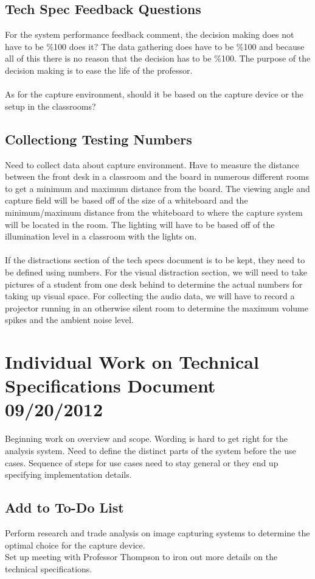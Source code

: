 \documentclass[]{article}
\begin{document}
		\subsection{Tech Spec Feedback Questions}
			For the system performance feedback comment, the decision making does not have to be \%100 does it? The data gathering does have to be \%100 and because all of this there is no reason that the decision has to be \%100. The purpose of the decision making is to ease the life of the professor. \\
			\\
			As for the capture environment, should it be based on the capture device or the setup in the classrooms? 
			
		\subsection{Collectiong Testing Numbers}
			Need to collect data about capture environment. Have to measure the distance between the front desk in a classroom and the board in numerous different rooms to get a minimum and maximum distance from the board. The viewing angle and capture field will be based off of the size of a whiteboard and the minimum/maximum distance from the whiteboard to where the capture system will be located in the room. The lighting will have to be based off of the illumination level in a classroom with the lights on. \\
			\\
			If the distractions section of the tech specs document is to be kept, they need to be defined using numbers. For the visual distraction section, we will need to take pictures of a student from one desk behind to determine the actual numbers for taking up visual space. For collecting the audio data, we will have to record a projector running in an otherwise silent room to determine the maximum volume spikes and the ambient noise level.
			
	
	\section{Individual Work on Technical Specifications Document 09/20/2012}
		Beginning work on overview and scope. Wording is hard to get right for the analysis system. Need to define the distinct parts of the system before the use cases. Sequence of steps for use cases need to stay general or they end up specifying implementation details. 
		
			\subsection{Add to To-Do List}
				Perform research and trade analysis on image capturing systems to determine the optimal choice for the capture device.\\
				Set up meeting with Professor Thompson to iron out more details on the technical specifications.
				
\end{document}
